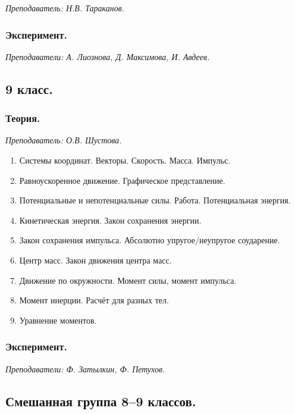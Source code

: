 \documentclass[11pt]{article}
\newlength{\h}
\newlength{\x}
\begin{document}
\textit{Преподаватель: Н.В. Тараканов.}

\subsubsection{Эксперимент.}
\label{sec:exp8}

\textit{Преподаватели: А. Лиознова, Д. Максимова, И. Авдеев.}

\subsection{9 класс.}
\label{sec:daily9}

\subsubsection{Теория.}
\label{sec:th9}

\textit{Преподаватель: О.В. Шустова.}

\begin{enumerate}
\item Системы координат. Векторы. Скорость. Масса. Импульс.
\item Равноускоренное движение. Графическое представление.
\item Потенциальные и непотенциальные силы. Работа. Потенциальная
  энергия.
\item Кинетическая энергия. Закон сохранения энергии.
\item Закон сохранения импульса. Абсолютно упругое/неупругое
  соударение.
\item Центр масс. Закон движения центра масс.
\item Движение по окружности. Момент силы, момент импульса.
\item Момент инерции. Расчёт для разных тел.
\item Уравнение моментов. 
\end{enumerate}

\subsubsection{Эксперимент.}
\label{sec:exp9}

\textit{Преподаватели: Ф. Затылкин, Ф. Петухов.}

\subsection{Смешанная группа 8--9 классов.}
\label{sec:daily89}
\end{document}

